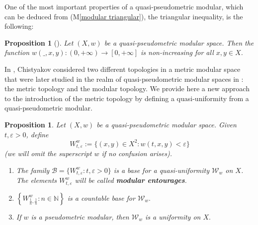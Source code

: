 \documentclass[11pt,a4paper]{amsart}
\newtheorem{proposition}[theorem]{Proposition}
\theoremstyle{definition}
\begin{document}
	One of the most important properties of a quasi-pseudometric modular, which can be deduced from (M\ref{modular triangular}), the triangular inequality, is the following:
	
	\begin{proposition}[\mbox{\cite[Lemma 3.1.1]{SebogodiPhD}}]\label{prop:isotone}
		Let $(X,w)$ be a quasi-pseudometric modular space. Then the function $w(\_,x,y):(0,+\infty)\to[0,+\infty]$ is non-increasing for all $x,y\in X$.
	\end{proposition}
	
	In \cite{Chis15}, Chistyakov considered two different topologies in a metric modular space that were later studied in the realm of quasi-pseudometric modular spaces in \cite{SebogodiPhD}: the metric topology and the modular topology. We provide here a new approach to the introduction of the metric topology by defining a quasi-uniformity from a quasi-pseudometric modular. 
	
	\begin{proposition}\label{prop: W base uniformity}
		Let $(X,w)$ be a quasi-pseudometric modular space. Given $t,\varepsilon>0$, define
		$$W^{w}_{t,\varepsilon}:=\{(x,y)\in X^2: w(t,x,y)<\varepsilon\}$$
		(we will omit the superscript $w$ if no confusion arises).
		\begin{enumerate}
			\item The family $\mathcal{B}=\{W^{w}_{t,\varepsilon}:t,\varepsilon>0\}$ is a base for a quasi-uniformity $\mathcal{W}_w$ on $X$. The elements $W^{w}_{t,\varepsilon}$ will be called \textbf{modular entourages}.
			\item $\left\{W^{w}_{\frac{1}{n},\frac{1}{n}}:n\in\mathbb{N}\right\}$ is a countable base for $\mathcal{W}_w.$
			\item If $w$ is a pseudometric modular, then $\mathcal{W}_w$ is a uniformity on $X.$
		\end{enumerate}
	\end{proposition}
	
\end{document}
